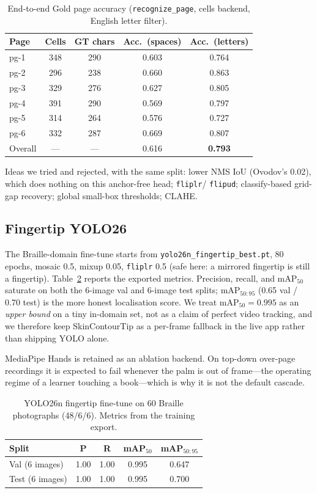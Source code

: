 \documentclass[conference]{IEEEtran}
\begin{document}
\begin{table}[t]
\caption{End-to-end Gold page accuracy (\texttt{recognize\_page}, cells
backend, English letter filter).}
\label{tab:e2e}
\centering
\begin{tabular}{lcccc}
\toprule
Page & Cells & GT chars & Acc.\ (spaces) & Acc.\ (letters) \\
\midrule
pg-1 & 348 & 290 & 0.603 & 0.764 \\
pg-2 & 296 & 238 & 0.660 & 0.863 \\
pg-3 & 329 & 276 & 0.627 & 0.805 \\
pg-4 & 391 & 290 & 0.569 & 0.797 \\
pg-5 & 314 & 264 & 0.576 & 0.727 \\
pg-6 & 332 & 287 & 0.669 & 0.807 \\
\midrule
Overall & --- & --- & 0.616 & \textbf{0.793} \\
\bottomrule
\end{tabular}
\end{table}

Ideas we tried and rejected, with the same split: lower NMS IoU (Ovodov's
0.02), which does nothing on this anchor-free head; \texttt{fliplr}/
\texttt{flipud}; classify-based grid-gap recovery; global small-box
thresholds; CLAHE.

\subsection{Fingertip YOLO26}
\label{sec:exp-tip}
The Braille-domain fine-tune starts from
\texttt{yolo26n\_fingertip\_best.pt}, 80 epochs, mosaic 0.5, mixup 0.05,
\texttt{fliplr} 0.5 (safe here: a mirrored fingertip is still a
fingertip). Table~\ref{tab:tip} reports the exported metrics. Precision,
recall, and mAP$_{50}$ saturate on both the 6-image val and 6-image test
splits; mAP$_{50:95}$ (0.65 val / 0.70 test) is the more honest
localisation score. We treat mAP$_{50}=0.995$ as an \textit{upper bound}
on a tiny in-domain set, not as a claim of perfect video tracking, and
we therefore keep SkinContourTip as a per-frame fallback in the live
app rather than shipping YOLO alone.

MediaPipe Hands is retained as an ablation backend. On top-down
over-page recordings it is expected to fail whenever the palm is out of
frame---the operating regime of a learner touching a book---which is why
it is not the default cascade.

\begin{table}[t]
\caption{YOLO26n fingertip fine-tune on 60 Braille photographs
(48/6/6). Metrics from the training export.}
\label{tab:tip}
\centering
\begin{tabular}{lcccc}
\toprule
Split & P & R & mAP$_{50}$ & mAP$_{50:95}$ \\
\midrule
Val (6 images) & 1.00 & 1.00 & 0.995 & 0.647 \\
Test (6 images) & 1.00 & 1.00 & 0.995 & 0.700 \\
\bottomrule
\end{tabular}
\end{table}
\end{document}
